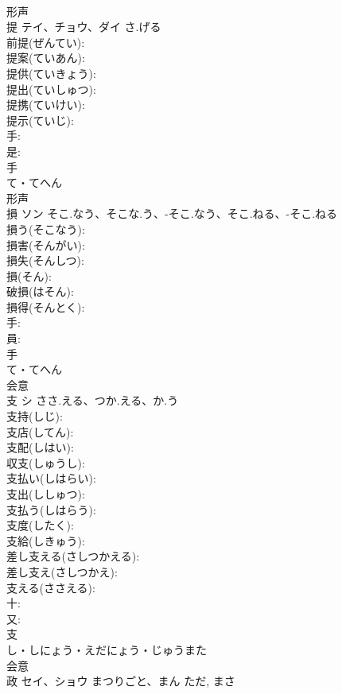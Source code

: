 \documentclass[8pt]{extreport}
\begin{document}
\begin{CJK}{UTF8}{min}
\\	形声 
\\	提	テイ、チョウ、ダイ	さ.げる		
\\	前提(ぜんてい): 
\\	提案(ていあん): 
\\	提供(ていきょう): 
\\	提出(ていしゅつ): 
\\	提携(ていけい): 
\\	提示(ていじ): 
\\	手: 
\\	是: 
\\	手	
\\	て・てへん	
\\	形声 
\\	損	ソン	そこ.なう、そこな.う、-そこ.なう、そこ.ねる、-そこ.ねる		
\\	損う(そこなう): 
\\	損害(そんがい): 
\\	損失(そんしつ): 
\\	損(そん): 
\\	破損(はそん): 
\\	損得(そんとく): 
\\	手: 
\\	員: 
\\	手	
\\	て・てへん	
\\	会意 
\\	支	シ	ささ.える、つか.える、か.う		
\\	支持(しじ): 
\\	支店(してん): 
\\	支配(しはい): 
\\	収支(しゅうし): 
\\	支払い(しはらい): 
\\	支出(ししゅつ): 
\\	支払う(しはらう): 
\\	支度(したく): 
\\	支給(しきゅう): 
\\	差し支える(さしつかえる): 
\\	差し支え(さしつかえ): 
\\	支える(ささえる): 
\\	十: 
\\	又: 
\\	支	
\\	し・しにょう・えだにょう・じゅうまた	
\\	会意 
\\	政	セイ、ショウ	まつりごと、まん	ただ, まさ	

\end{CJK}
\end{document}

